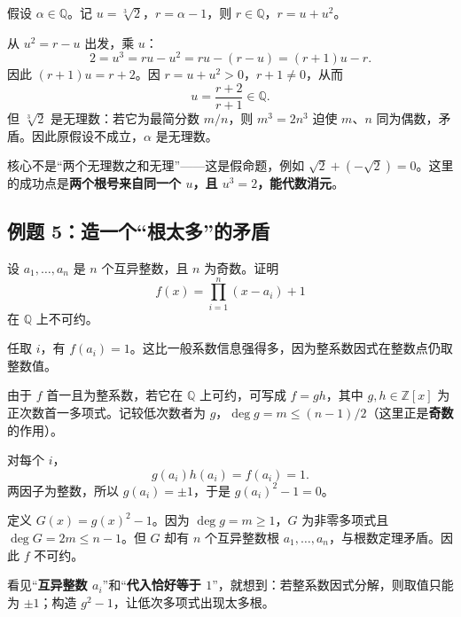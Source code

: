 \documentclass[12pt,a4paper,UTF8,fontset=none]{ctexart}
\begin{document}
 假设 $\alpha\in\mathbb Q$。记 $u=\sqrt[3]2$，$r=\alpha-1$，则 $r\in\mathbb Q$，$r=u+u^2$。

 从 $u^2=r-u$ 出发，乘 $u$：
\[
2=u^3=ru-u^2=ru-(r-u)=(r+1)u-r.
\]
因此 $(r+1)u=r+2$。因 $r=u+u^2>0$，$r+1\ne0$，从而
\[
u=\frac{r+2}{r+1}\in\mathbb Q.
\]
但 $\sqrt[3]2$ 是无理数：若它为最简分数 $m/n$，则 $m^3=2n^3$ 迫使 $m$、$n$ 同为偶数，矛盾。因此原假设不成立，$\alpha$ 是无理数。\proofdone

\begin{whybox}
核心不是“两个无理数之和无理”——这是假命题，例如 $\sqrt2+(-\sqrt2)=0$。这里的成功点是\textbf{两个根号来自同一个 $u$，且 $u^3=2$，能代数消元}。
\end{whybox}

\subsection{例题 5：造一个“根太多”的矛盾}
\begin{questionbox}[黑板例题 5]
设 $a_1,\ldots,a_n$ 是 $n$ 个互异整数，且 $n$ 为奇数。证明
\[
f(x)=\prod_{i=1}^n(x-a_i)+1
\]
在 $\mathbb Q$ 上不可约。
\end{questionbox}

 任取 $i$，有 $f(a_i)=1$。这比一般系数信息强得多，因为整系数因式在整数点仍取整数值。

 由于 $f$ 首一且为整系数，若它在 $\mathbb Q$ 上可约，可写成 $f=gh$，其中 $g,h\in\mathbb Z[x]$ 为正次数首一多项式。记较低次数者为 $g$，$\deg g=m\le(n-1)/2$（这里正是\textbf{奇数}的作用）。

 对每个 $i$，
\[
g(a_i)h(a_i)=f(a_i)=1.
\]
两因子为整数，所以 $g(a_i)=\pm1$，于是 $g(a_i)^2-1=0$。

 定义 $G(x)=g(x)^2-1$。因为 $\deg g=m\ge1$，$G$ 为非零多项式且 $\deg G=2m\le n-1$。但 $G$ 却有 $n$ 个互异整数根 $a_1,\ldots,a_n$，与根数定理矛盾。因此 $f$ 不可约。\proofdone

\begin{takeawaybox}
看见“\textbf{互异整数 $a_i$}”和“\textbf{代入恰好等于 $1$}”，就想到：若整系数因式分解，则取值只能为 $\pm1$；构造 $g^2-1$，让低次多项式出现太多根。
\end{takeawaybox}
\end{document}
